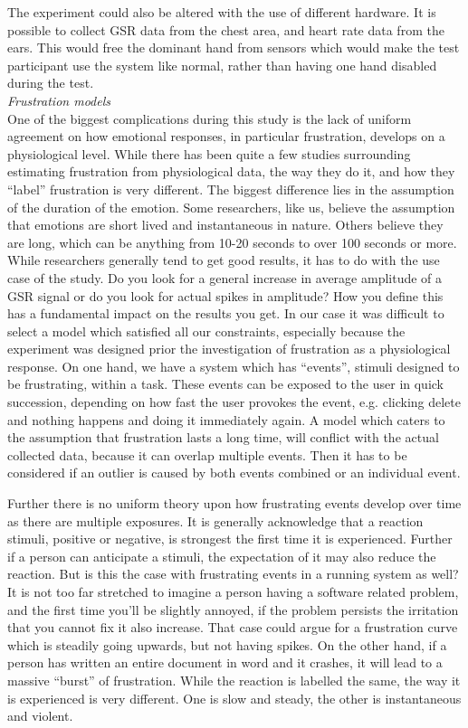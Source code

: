 The experiment could also be altered with the use of different hardware. It is possible to collect GSR data from the chest area, and heart rate data from the ears. This would free the dominant hand from sensors which would make the test participant use the system like normal, rather than having one hand disabled during the test.\\

\textit{Frustration models}\\
One of the biggest complications during this study is the lack of uniform agreement on how emotional responses, in particular frustration, develops on a physiological level. While there has been quite a few studies surrounding estimating frustration from physiological data, the way they do it, and how they ``label'' frustration is very different.
The biggest difference lies in the assumption of the duration of the emotion. 
Some researchers, like us, believe the assumption that emotions are short lived and instantaneous in nature. 
Others believe they are long, which can be anything from 10-20 seconds to over 100 seconds or more. 
While researchers generally tend to get good results, it has to do with the use case of the study. 
Do you look for a general increase in average amplitude of a GSR signal or do you look for actual spikes in amplitude? 
How you define this has a fundamental impact on the results you get. 
In our case it was difficult to select a model which satisfied all our constraints, especially because the experiment was designed prior the investigation of frustration as a physiological response. 
On one hand, we have a system which has ``events'', stimuli designed to be frustrating, within a task. These events can be exposed to the user in quick succession, depending on how fast the user provokes the event, e.g. clicking delete and nothing happens and doing it immediately again. 
A model which caters to the assumption that frustration lasts a long time, will conflict with the actual collected data, because it can overlap multiple events. Then it has to be considered if an outlier is caused by both events combined or an individual event. 

Further there is no uniform theory upon how frustrating events develop over time as there are multiple exposures. It is generally acknowledge that a reaction stimuli, positive or negative, is strongest the first time it is experienced. Further if a person can anticipate a stimuli, the expectation of it may also reduce the reaction. But is this the case with frustrating events in a running system as well? It is not too far stretched to imagine a person having a software related problem, and the first time you'll be slightly annoyed, if the problem persists the irritation that you cannot fix it also increase. That case could argue for a frustration curve which is steadily going upwards, but not having spikes.
On the other hand, if a person has written an entire document in word and it crashes, it will lead to a massive ``burst'' of frustration. 
While the reaction is labelled the same, the way it is experienced is very different. One is slow and steady, the other is instantaneous and violent.

